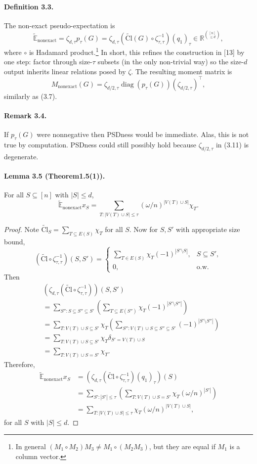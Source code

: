 \documentclass[10pt,a4paper]{article}
\begin{document}
\paragraph{Definition 3.3.} The non-exact pseudo-expectation is
\[\widetilde{\mathbb E}_{\mathrm{nonexact}}=\zeta_{d,\tau}p_\tau(G)=\zeta_{d,\tau}\left(\widetilde{\mathrm{Cl}}(G)\circ\zeta_{\tau,\tau}^{-1}\right)(q_1)_\tau\in\mathbb R^{\binom{[n]}{\le d}},\tag{3.10}\]
where $\circ$ is Hadamard product.\footnote{In general $(M_1\circ M_2)M_3\ne M_1\circ(M_2M_3)$, but they are equal if $M_1$ is a column vector.} In short, this refines the construction in [13] by one step: factor through size-$\tau$ subsets (in the only non-trivial way) so the size-$d$ output inherits linear relations posed by $\zeta$. The resulting moment matrix is
\[M_{\mathrm{nonexact}}(G)=\zeta_{d/2,\tau}\operatorname{diag}(p_\tau(G))(\zeta_{d/2,\tau})^\top,\tag{3.11}\]
similarly as (3.7).
\paragraph{Remark 3.4.} If $p_\tau(G)$ were nonnegative then PSDness would be immediate. Alas, this is not true by computation. PSDness could still possibly hold because $\zeta_{d/2,\tau}$ in (3.11) is degenerate.
\paragraph{Lemma 3.5 (Theorem1.5(1)).} For all $S\subseteq[n]$ with $|S|\le d$,
\[\widetilde{\mathbb E}_{\mathrm{nonexact}}x_S=\sum_{T:|V(T)\cup S|\le\tau}(\omega/n)^{|V(T)\cup S|}\chi_T.\tag{3.12}\]
\begin{proof}Note $\widetilde{\mathrm{Cl}}_S=\sum_{T\subseteq E(S)}\chi_T$ for all $S$. Now for $S,S'$ with appropriate size bound,
\[\left(\widetilde{\mathrm{Cl}}\circ\zeta_{\tau,\tau}^{-1}\right)(S,S')=\begin{cases}\sum_{T\in E(S)}\chi_T(-1)^{|S'\setminus S|},&S\subseteq S',\\0,&\text{o.w.}\end{cases}\]
Then
\begin{align*}&\left(\zeta_{d,\tau}(\widetilde{\mathrm{Cl}}\circ\zeta_{\tau,\tau}^{-1})\right)(S,S')\\&=\sum_{S'':S\subseteq S''\subseteq S'}\left(\sum_{T\subseteq E(S'')}\chi_T(-1)^{|S'\setminus S''|}\right)\\&=\sum_{T:V(T)\cup S\subseteq S'}\chi_T\left(\sum_{S'':V(T)\cup S\subseteq S''\subseteq S'}(-1)^{|S'\setminus S''|}\right)\\&=\sum_{T:V(T)\cup S\subseteq S'}\chi_T\delta_{S'=V(T)\cup S}\\&=\sum_{T:V(T)\cup S=S'}\chi_T.\end{align*}
Therefore,
\begin{align*}\widetilde{\mathbb E}_{\mathrm{nonexact}}x_S&=\left(\zeta_{d,\tau}(\widetilde{\mathrm{Cl}}\circ\zeta_{\tau,\tau}^{-1})(q_1)_\tau\right)(S)\\&=\sum_{S':|S'|\le\tau}\left(\sum_{T:V(T)\cup S=S'}\chi_T(\omega/n)^{|S'|}\right)\\&=\sum_{T:|V(T)\cup S|\le\tau}\chi_T(\omega/n)^{|V(T)\cup S|},\end{align*}
for all $S$ with $|S|\le d$.\end{proof}
\end{document}
